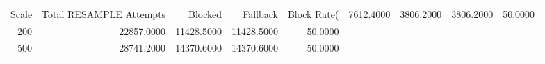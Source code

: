 \begin{tabular}{rrrrr}
\toprule
Scale & Total RESAMPLE Attempts & Blocked & Fallback & Block Rate(%
 & 7612.4000 & 3806.2000 & 3806.2000 & 50.0000 \\
200 & 22857.0000 & 11428.5000 & 11428.5000 & 50.0000 \\
500 & 28741.2000 & 14370.6000 & 14370.6000 & 50.0000 \\
\bottomrule
\end{tabular}
